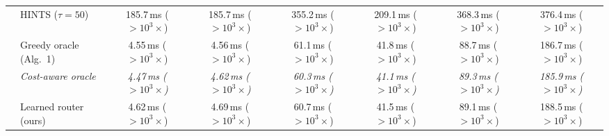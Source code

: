 {\begin{tabular}{llcccccc}
 & HINTS ($\tau{=}50$) & 185.7\,ms ($>10^{3}\times$) & 185.7\,ms ($>10^{3}\times$) & 355.2\,ms ($>10^{3}\times$) & 209.1\,ms ($>10^{3}\times$) & 368.3\,ms ($>10^{3}\times$) & 376.4\,ms ($>10^{3}\times$) \\
 & Greedy oracle (Alg.~1) & 4.55\,ms ($>10^{3}\times$) & 4.56\,ms ($>10^{3}\times$) & 61.1\,ms ($>10^{3}\times$) & 41.8\,ms ($>10^{3}\times$) & 88.7\,ms ($>10^{3}\times$) & 186.7\,ms ($>10^{3}\times$) \\
 & \textit{Cost-aware oracle} & \textit{4.47\,ms ($>10^{3}\times$)} & \textit{4.62\,ms ($>10^{3}\times$)} & \textit{60.3\,ms ($>10^{3}\times$)} & \textit{41.1\,ms ($>10^{3}\times$)} & \textit{89.3\,ms ($>10^{3}\times$)} & \textit{185.9\,ms ($>10^{3}\times$)} \\
 & Learned router (ours) & 4.62\,ms ($>10^{3}\times$) & 4.69\,ms ($>10^{3}\times$) & 60.7\,ms ($>10^{3}\times$) & 41.5\,ms ($>10^{3}\times$) & 89.1\,ms ($>10^{3}\times$) & 188.5\,ms ($>10^{3}\times$) \\
\bottomrule
\end{tabular}}
